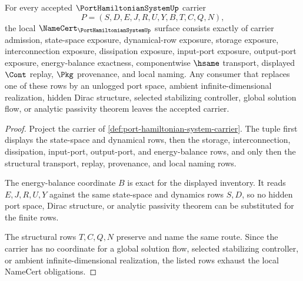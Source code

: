 \begin{theorem}
\label{thm:port-hamiltonian-system-namecert-obligations}
For every accepted $\PortHamiltonianSystemUp$ carrier
$$
P=(S,D,E,J,R,U,Y,B,T,C,Q,N),
$$
the local $\NameCert_{\PortHamiltonianSystemUp}$ surface consists exactly of carrier admission, state-space exposure, dynamical-row exposure, storage exposure, interconnection exposure, dissipation exposure, input-port exposure, output-port exposure, energy-balance exactness, componentwise $\hsame$ transport, displayed $\Cont$ replay, $\Pkg$ provenance, and local naming. Any consumer that replaces one of these rows by an unlogged port space, ambient infinite-dimensional realization, hidden Dirac structure, selected stabilizing controller, global solution flow, or analytic passivity theorem leaves the accepted carrier.
\end{theorem}
\begin{proof}
Project the carrier of \autoref{def:port-hamiltonian-system-carrier}. The tuple first displays the state-space and dynamical rows, then the storage, interconnection, dissipation, input-port, output-port, and energy-balance rows, and only then the structural transport, replay, provenance, and local naming rows.

The energy-balance coordinate $B$ is exact for the displayed inventory. It reads $E,J,R,U,Y$ against the same state-space and dynamics rows $S,D$, so no hidden port space, Dirac structure, or analytic passivity theorem can be substituted for the finite rows.

The structural rows $T,C,Q,N$ preserve and name the same route. Since the carrier has no coordinate for a global solution flow, selected stabilizing controller, or ambient infinite-dimensional realization, the listed rows exhaust the local NameCert obligations.
\end{proof}

